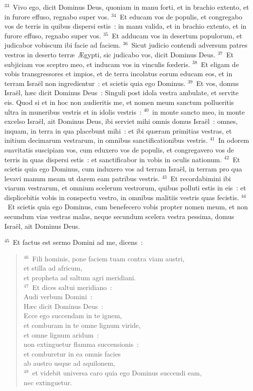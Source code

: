 ${}^{33}$~Vivo ego, dicit Dominus Deus, quoniam in manu forti, et in brachio extento, et in furore effuso, regnabo super vos.
${}^{34}$~Et educam vos de populis, et congregabo vos de terris in quibus dispersi estis~: in manu valida, et in brachio extento, et in furore effuso, regnabo super vos.
${}^{35}$~Et adducam vos in desertum populorum, et judicabor vobiscum ibi facie ad faciem.
${}^{36}$~Sicut judicio contendi adversum patres vestros in deserto terr\ae\ \AE gypti, sic judicabo vos, dicit Dominus Deus.
${}^{37}$~Et subjiciam vos sceptro meo, et inducam vos in vinculis fœderis.
${}^{38}$~Et eligam de vobis transgressores et impios, et de terra incolatus eorum educam eos, et in terram Isra\"el non ingredientur~: et scietis quia ego Dominus.
${}^{39}$~Et vos, domus Isra\"el, h\ae c dicit Dominus Deus~: Singuli post idola vestra ambulate, et servite eis. Quod si et in hoc non audieritis me, et nomen meum sanctum pollueritis ultra in muneribus vestris et in idolis vestris~:
${}^{40}$~in monte sancto meo, in monte excelso Isra\"el, ait Dominus Deus, ibi serviet mihi omnis domus Isra\"el~: omnes, inquam, in terra in qua placebunt mihi~: et ibi qu\ae ram primitias vestras, et initium decimarum vestrarum, in omnibus sanctificationibus vestris.
${}^{41}$~In odorem suavitatis suscipiam vos, cum eduxero vos de populis, et congregavero vos de terris in quas dispersi estis~: et sanctificabor in vobis in oculis nationum.
${}^{42}$~Et scietis quia ego Dominus, cum induxero vos ad terram Isra\"el, in terram pro qua levavi manum meam ut darem eam patribus vestris.
${}^{43}$~Et recordabimini ibi viarum vestrarum, et omnium scelerum vestrorum, quibus polluti estis in eis~: et displicebitis vobis in conspectu vestro, in omnibus malitiis vestris quas fecistis.
${}^{44}$~Et scietis quia ego Dominus, cum benefecero vobis propter nomen meum, et non secundum vias vestras malas, neque secundum scelera vestra pessima, domus Isra\"el, ait Dominus Deus.


${}^{45}$~Et factus est sermo Domini ad me, dicens~:
\begin{flushleft}\begin{verse}${}^{46}$~Fili hominis, pone faciem tuam contra viam austri,\\ et stilla ad africum,\\ et propheta ad saltum agri meridiani.\\
${}^{47}$~Et dices saltui meridiano~:\\ Audi verbum Domini~:\\ H\ae c dicit Dominus Deus~:\\ Ecce ego succendam in te ignem,\\ et comburam in te omne lignum viride,\\ et omne lignum aridum~:\\ non extinguetur flamma succensionis~:\\ et comburetur in ea omnis facies\\ ab austro usque ad aquilonem,\\
${}^{48}$~et videbit universa caro quia ego Dominus succendi eam,\\ nec extinguetur.\end{verse}\end{flushleft}


